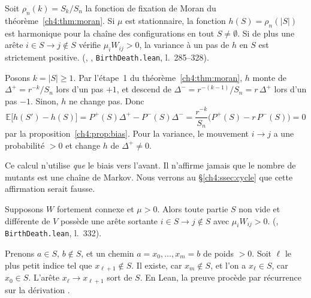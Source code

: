 \begin{proposition}\label{ch4:prop:harmgraph}
Soit $\rho_n(k)=S_k/S_n$ la fonction de fixation de Moran du théorème~\ref{ch4:thm:moran}. Si $\mu$ est
stationnaire, la fonction $h(S)=\rho_n(|S|)$ est harmonique pour la chaîne des configurations en tout
$S\ne\emptyset$. Si de plus une arête $i\in S\to j\notin S$ vérifie $\mu_iW_{ij}>0$, la variance à un pas de $h$ en
$S$ est strictement positive. \tierA{} (, ,
\texttt{BirthDeath.lean}, l.~285--328).
\end{proposition}

\begin{humanproof}
Posons $k=|S|\ge1$. Par l'étape~1 du théorème~\ref{ch4:thm:moran}, $h$ monte de $\Delta^{+}=r^{-k}/S_n$ lors d'un
pas $+1$, et descend de $\Delta^{-}=r^{-(k-1)}/S_n=r\,\Delta^{+}$ lors d'un pas $-1$. Sinon, $h$ ne change pas. Donc
\[
\mathbb E\bigl[h(S')-h(S)\bigr]=P^{+}(S)\Delta^{+}-P^{-}(S)\Delta^{-}=\frac{r^{-k}}{S_n}\bigl(P^{+}(S)-r\,P^{-}(S)\bigr)=0
\]
par la proposition~\ref{ch4:prop:bias}. Pour la variance, le mouvement $i\to j$ a une probabilité $>0$ et change
$h$ de $\Delta^{+}\ne0$.
\end{humanproof}

Ce calcul n'utilise \emph{que} le biais vers l'avant. Il n'affirme jamais que le nombre de mutants est une chaîne
de Markov. Nous verrons au §\ref{ch4:ssec:cycle} que cette affirmation serait fausse.

\begin{lemma}\label{ch4:lem:conn}
Supposons $W$ fortement connexe et $\mu>0$. Alors toute partie $S$ non vide et différente de $V$ possède une arête
sortante $i\in S\to j\notin S$ avec $\mu_iW_{ij}>0$. \tierA{} (,
\texttt{BirthDeath.lean}, l.~332).
\end{lemma}

\begin{humanproof}
Prenons $a\in S$, $b\notin S$, et un chemin $a=x_0,\dots,x_m=b$ de poids $>0$. Soit $\ell$ le plus petit indice tel
que $x_{\ell+1}\notin S$. Il existe, car $x_m\notin S$, et l'on a $x_\ell\in S$, car $x_0\in S$. L'arête
$x_\ell\to x_{\ell+1}$ sort de $S$. En Lean, la preuve procède par récurrence sur la dérivation .
\end{humanproof}

